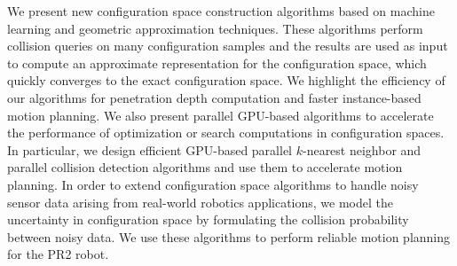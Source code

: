 We present new configuration space construction algorithms based on machine learning and geometric approximation techniques. These algorithms perform collision queries on many configuration samples and the results are used as input to compute an approximate representation for the configuration space, which quickly converges to the exact configuration space. We highlight the efficiency of our algorithms for penetration depth computation and faster instance-based motion planning. We also present parallel GPU-based algorithms to accelerate the performance of optimization or search computations in configuration spaces. In particular, we design efficient GPU-based parallel $k$-nearest neighbor and parallel collision detection algorithms and use them to accelerate motion planning. In order to extend configuration space algorithms to handle noisy sensor data arising from real-world robotics applications,
we model the uncertainty in configuration space by formulating the collision probability between noisy data. We use these algorithms to perform reliable motion planning for the PR2 robot.
